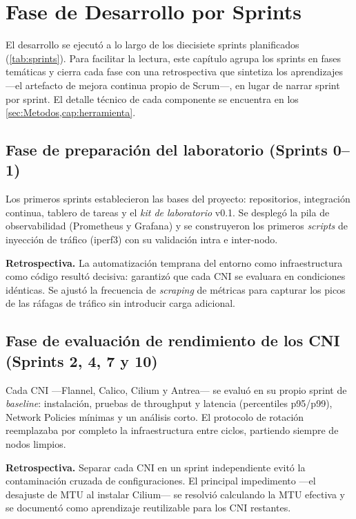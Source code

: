 \chapter{Fase de Desarrollo por Sprints} \label{cap:desarrollo}

El desarrollo se ejecutó a lo largo de los diecisiete sprints planificados (\cref{tab:sprints}). Para facilitar la lectura, este capítulo agrupa los sprints en fases temáticas y cierra cada fase con una retrospectiva que sintetiza los aprendizajes ---el artefacto de mejora continua propio de Scrum---, en lugar de narrar sprint por sprint. El detalle técnico de cada componente se encuentra en los \cref{sec:Metodos,cap:herramienta}.

\section{Fase de preparación del laboratorio (Sprints 0--1)}

Los primeros sprints establecieron las bases del proyecto: repositorios, integración continua, tablero de tareas y el \emph{kit de laboratorio} v0.1. Se desplegó la pila de observabilidad (Prometheus y Grafana) y se construyeron los primeros \emph{scripts} de inyección de tráfico (iperf3) con su validación intra e inter-nodo.

\textbf{Retrospectiva.} La automatización temprana del entorno como infraestructura como código resultó decisiva: garantizó que cada CNI se evaluara en condiciones idénticas. Se ajustó la frecuencia de \emph{scraping} de métricas para capturar los picos de las ráfagas de tráfico sin introducir carga adicional.

\section{Fase de evaluación de rendimiento de los CNI (Sprints 2, 4, 7 y 10)}

Cada CNI ---Flannel, Calico, Cilium y Antrea--- se evaluó en su propio sprint de \emph{baseline}: instalación, pruebas de throughput y latencia (percentiles p95/p99), Network Policies mínimas y un análisis corto. El protocolo de rotación reemplazaba por completo la infraestructura entre ciclos, partiendo siempre de nodos limpios.

\textbf{Retrospectiva.} Separar cada CNI en un sprint independiente evitó la contaminación cruzada de configuraciones. El principal impedimento ---el desajuste de MTU al instalar Cilium--- se resolvió calculando la MTU efectiva y se documentó como aprendizaje reutilizable para los CNI restantes.

